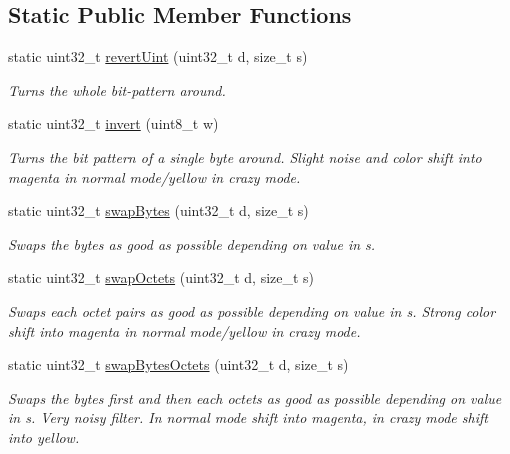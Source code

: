\subsection*{Static Public Member Functions}
\begin{DoxyCompactItemize}
\item 
static uint32\+\_\+t \mbox{\hyperlink{classFilter_ae4a4b081886014742d083d9a2b285981}{revert\+Uint}} (uint32\+\_\+t d, size\+\_\+t s)
\begin{DoxyCompactList}\small\item\em Turns the whole bit-\/pattern around. \end{DoxyCompactList}\item 
static uint32\+\_\+t \mbox{\hyperlink{classFilter_a55f792b3f87991db5a5e666827d6214c}{invert}} (uint8\+\_\+t w)
\begin{DoxyCompactList}\small\item\em Turns the bit pattern of a single byte around. Slight noise and color shift into magenta in normal mode/yellow in crazy mode. \end{DoxyCompactList}\item 
static uint32\+\_\+t \mbox{\hyperlink{classFilter_a9d4f7bd12f0bfdf200abf53d166fd944}{swap\+Bytes}} (uint32\+\_\+t d, size\+\_\+t s)
\begin{DoxyCompactList}\small\item\em Swaps the bytes as good as possible depending on value in s. \end{DoxyCompactList}\item 
static uint32\+\_\+t \mbox{\hyperlink{classFilter_aeb85c27a3d80540f2bd4b5f314543d4c}{swap\+Octets}} (uint32\+\_\+t d, size\+\_\+t s)
\begin{DoxyCompactList}\small\item\em Swaps each octet pairs as good as possible depending on value in s. Strong color shift into magenta in normal mode/yellow in crazy mode. \end{DoxyCompactList}\item 
static uint32\+\_\+t \mbox{\hyperlink{classFilter_a55c046859fbbb468536cae5c1f95c702}{swap\+Bytes\+Octets}} (uint32\+\_\+t d, size\+\_\+t s)
\begin{DoxyCompactList}\small\item\em Swaps the bytes first and then each octets as good as possible depending on value in s. Very noisy filter. In normal mode shift into magenta, in crazy mode shift into yellow. \end{DoxyCompactList}\item 

\end{DoxyCompactItemize}
